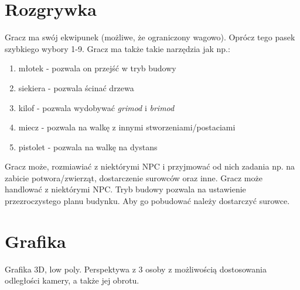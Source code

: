 \documentclass[12pt]{article}
\begin{document}
	\section{Rozgrywka}
	Gracz ma swój ekwipunek (możliwe, że ograniczony wagowo). Oprócz tego pasek szybkiego wybory 1-9.\newline\newline
	Gracz ma także takie narzędzia jak np.:
	\begin{enumerate}
		\item młotek - pozwala on przejść w tryb budowy
		\item siekiera - pozwala ścinać drzewa
		\item kilof - pozwala wydobywać \textit{grimod} i \textit{brimod}
		\item miecz - pozwala na walkę z innymi stworzeniami/postaciami
		\item pistolet - pozwala na walkę na dystans
	\end{enumerate}
	Gracz może, rozmiawiać z niektórymi NPC i przyjmować od nich zadania np. na zabicie potwora/zwierząt, dostarczenie surowców oraz inne.\newline\newline
	Gracz może handlować z niektórymi NPC.
	\newline\newline
	Tryb budowy pozwala na ustawienie przezroczystego planu budynku. Aby go pobudować należy dostarczyć surowce.
	
	\section{Grafika}
	Grafika 3D, low poly. Perspektywa z 3 osoby z możliwością dostosowania odległości kamery, a także jej obrotu.
\end{document}
